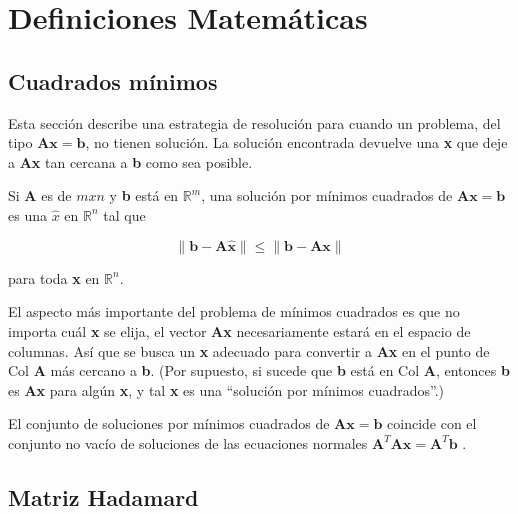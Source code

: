 
\chapter{Definiciones Matemáticas} %

\label{AppendixB} %



\section{Cuadrados mínimos} \label{sec:meanSquare}

Esta sección describe una estrategia de resolución para cuando un problema, del tipo $\mathbf{Ax} = \mathbf{b}$, no tienen solución. 
La solución encontrada devuelve una \textbf{x} que deje a \textbf{Ax} tan cercana a \textbf{b} como sea posible.  

Si \textbf{A} es de $m x n$ y \textbf{b} está en $\mathds{R}^m$, una solución por mínimos cuadrados de $\mathbf{Ax} = \mathbf{b}$
es una $\hat{x}$ en $\mathds{R}^n$ tal que

$$
\parallel \mathbf{b} - \mathbf{A\hat{x}}\parallel \le \parallel\mathbf{b}-\mathbf{Ax} \parallel
$$

para toda \textbf{x} en $\mathds{R}^n$.

El aspecto más importante del problema de mínimos cuadrados es que no importa cuál \textbf{x} se elija, el vector \textbf{Ax}
necesariamente estará en el espacio de columnas. Así que se busca un \textbf{x} adecuado para convertir a \textbf{Ax} en el 
punto de Col \textbf{A} más cercano a \textbf{b}. (Por supuesto, si sucede que \textbf{b} está en Col \textbf{A}, entonces 
\textbf{b} es \textbf{Ax} para algún \textbf{x}, y tal \textbf{x} es una “solución por mínimos cuadrados”.)

El conjunto de soluciones por mínimos cuadrados de $\mathbf{Ax} = \mathbf{b}$ coincide con el conjunto no vacío de soluciones
de las ecuaciones normales $\mathbf{A}^T\mathbf{Ax} = \mathbf{A}^T\mathbf{b}$ \cite{MatrixMin}.

\section{Matriz Hadamard}

